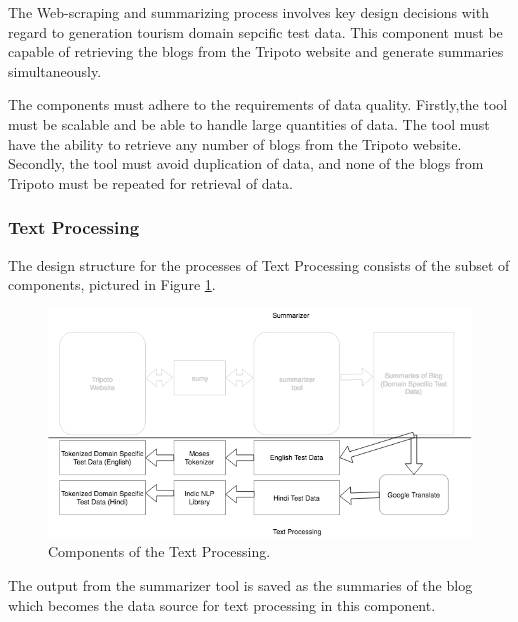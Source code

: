The Web-scraping and summarizing process involves key design decisions with regard to generation tourism domain sepcific test data. This component must be capable of retrieving the blogs from the Tripoto website and generate summaries simultaneously. 

The components must adhere to the requirements of data quality. Firstly,the tool must be scalable and be able to handle large quantities of data. The tool must have the ability to retrieve any number of blogs from the Tripoto website. Secondly, the tool must avoid duplication of data, and none of the blogs from Tripoto must be repeated for retrieval of data.

\subsubsection{Text Processing}
The design structure for the processes of Text Processing consists of the subset of components, pictured in Figure \ref{summarizer3}.

\begin{figure}[h]
\includegraphics[width=\textwidth]{figures/design6.png}
\caption{Components of the Text Processing.} \label{summarizer3}
\end{figure}

The output from the summarizer tool is saved as the summaries of the blog which becomes the data source for text processing in this component. 


